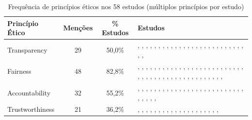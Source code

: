 



\begin{table}[htbp]
\centering
\caption{Frequência de princípios éticos nos 58 estudos (múltiplos princípios por estudo)}
\label{tab:principles}
\scriptsize
\begin{tabular}{lccp{6.5cm}}
\hline
\textbf{Princípio Ético} & \textbf{Menções} & \textbf{\% Estudos} & \textbf{Estudos} \\
\hline
Transparency                   & 29 & 50,0\% & \cite{S001}, \cite{S002}, \cite{S003}, \cite{S004}, \cite{S006}, \cite{S007}, \cite{S008}, \cite{S011}, \cite{S012}, \cite{S013}, \cite{S014}, \cite{S015}, \cite{S016}, \cite{S023}, \cite{S024}, \cite{S028}, \cite{S029}, \cite{S033}, \cite{S038}, \cite{S039}, \cite{S041}, \cite{S042}, \cite{S043}, \cite{S044}, \cite{S046}, \cite{S047}, \cite{S050}, \cite{S053}, \cite{S058} \\
\hline
Fairness                       & 48 & 82,8\% & \cite{S001}, \cite{S002}, \cite{S003}, \cite{S004}, \cite{S006}, \cite{S007}, \cite{S008}, \cite{S010}, \cite{S012}, \cite{S013}, \cite{S014}, \cite{S015}, \cite{S017}, \cite{S018}, \cite{S019}, \cite{S020}, \cite{S021}, \cite{S022}, \cite{S023}, \cite{S024}, \cite{S025}, \cite{S028}, \cite{S029}, \cite{S030}, \cite{S031}, \cite{S032}, \cite{S033}, \cite{S034}, \cite{S035}, \cite{S036}, \cite{S038}, \cite{S039}, \cite{S040}, \cite{S041}, \cite{S042}, \cite{S044}, \cite{S045}, \cite{S046}, \cite{S047}, \cite{S048}, \cite{S050}, \cite{S052}, \cite{S053}, \cite{S054}, \cite{S055}, \cite{S056}, \cite{S057}, \cite{S058} \\
\hline
Accountability                 & 32 & 55,2\% & \cite{S001}, \cite{S003}, \cite{S004}, \cite{S005}, \cite{S006}, \cite{S009}, \cite{S012}, \cite{S013}, \cite{S014}, \cite{S016}, \cite{S018}, \cite{S019}, \cite{S023}, \cite{S028}, \cite{S029}, \cite{S033}, \cite{S035}, \cite{S038}, \cite{S039}, \cite{S041}, \cite{S042}, \cite{S043}, \cite{S044}, \cite{S046}, \cite{S048}, \cite{S049}, \cite{S050}, \cite{S051}, \cite{S053}, \cite{S055}, \cite{S056}, \cite{S058} \\
\hline
Trustworthiness                & 21 & 36,2\% & \cite{S001}, \cite{S002}, \cite{S006}, \cite{S009}, \cite{S011}, \cite{S012}, \cite{S014}, \cite{S016}, \cite{S023}, \cite{S024}, \cite{S025}, \cite{S027}, \cite{S028}, \cite{S031}, \cite{S033}, \cite{S037}, \cite{S038}, \cite{S039}, \cite{S047}, \cite{S048}, \cite{S053} \\

\end{tabular}
\end{table}
